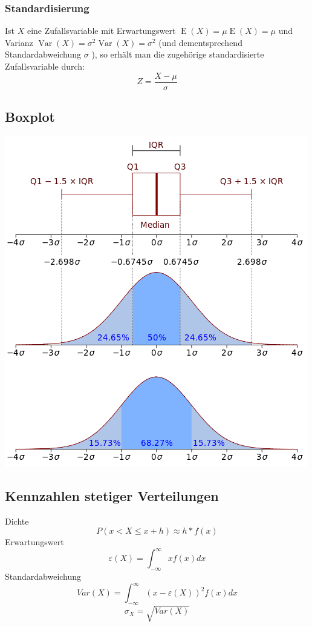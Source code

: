 \documentclass{article}
\begin{document}
\begin{multicols*}{3}
  \subsubsection{Standardisierung}

  Ist $X$ eine Zufallsvariable mit Erwartungswert ${\displaystyle \operatorname {E} (X)=\mu } \operatorname {E}(X)=\mu$  und Varianz
  ${\displaystyle \operatorname {Var} (X)=\sigma ^{2}} \operatorname {Var}(X)=\sigma ^{2}$ (und dementsprechend Standardabweichung $\sigma$ ), so erhält man die zugehörige standardisierte Zufallsvariable durch:
  $${\displaystyle Z={\frac {X-\mu }{\sigma }}}$$

  \subsection{Boxplot}

  \includegraphics[scale=0.48, angle=0]{box}

  \subsection{Kennzahlen stetiger Verteilungen}
  Dichte
  $$P(x<X\leq x+h) \approx h*f(x)$$
  Erwartungswert
  $$\varepsilon (X) = \int _{-\infty}^{\infty} xf(x)dx$$
  Standardabweichung
  $$Var(X) = \int _{-\infty}^{\infty} (x-\varepsilon(X))^2 f(x)dx$$
  $$\sigma _X = \sqrt{Var(X)}$$


\end{multicols*}
\end{document}
